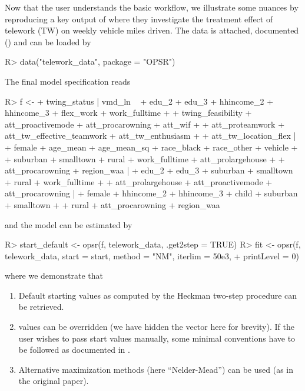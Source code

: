 \documentclass[%
    twoside, openright, titlepage, numbers=noenddot,%
    cleardoublepage=empty,%
    abstract=false,%
    BCOR=5.5mm, paper=a5, fontsize=10pt,%
]{scrreprt}
\begin{document}
Now that the user understands the basic workflow, we illustrate some nuances by reproducing a key output of \cite{Wang+Mokhtarian:2024} where they investigate the treatment effect of telework (TW) on weekly vehicle miles driven. The data is attached, documented () and can be loaded by
%
\begin{Schunk}
\begin{Sinput}
R> data("telework_data", package = "OPSR")
\end{Sinput}
\end{Schunk}
%
%
The final model specification reads
%
\begin{Schunk}
\begin{Sinput}
R> f <-
+    twing_status | vmd_ln ~
+    edu_2 + edu_3 + hhincome_2 + hhincome_3 + flex_work + work_fulltime +
+    twing_feasibility + att_proactivemode + att_procarowning + att_wif +
+    att_proteamwork + att_tw_effective_teamwork + att_tw_enthusiasm +
+    att_tw_location_flex |
+    female + age_mean + age_mean_sq + race_black + race_other + vehicle +
+    suburban + smalltown + rural + work_fulltime + att_prolargehouse +
+    att_procarowning + region_waa |
+    edu_2 + edu_3 + suburban + smalltown + rural + work_fulltime +
+    att_prolargehouse + att_proactivemode + att_procarowning |
+    female + hhincome_2 + hhincome_3 + child + suburban + smalltown +
+    rural + att_procarowning + region_waa
\end{Sinput}
\end{Schunk}
%
and the model can be estimated by
%
\begin{Schunk}
\begin{Sinput}
R> start_default <- opsr(f, telework_data, .get2step = TRUE)
R> fit <- opsr(f, telework_data, start = start, method = "NM", iterlim = 50e3,
+    printLevel = 0)
\end{Sinput}
\end{Schunk}
%
where we demonstrate that
\begin{enumerate}
\item Default starting values as computed by the Heckman two-step procedure can be retrieved.
\item {} values can be overridden (we have hidden the  vector here for brevity). If the user wishes to pass start values manually, some minimal conventions have to be followed as documented in .
\item Alternative maximization methods (here ``Nelder-Mead'') can be used (as in the original paper).
\end{enumerate}
\end{document}
